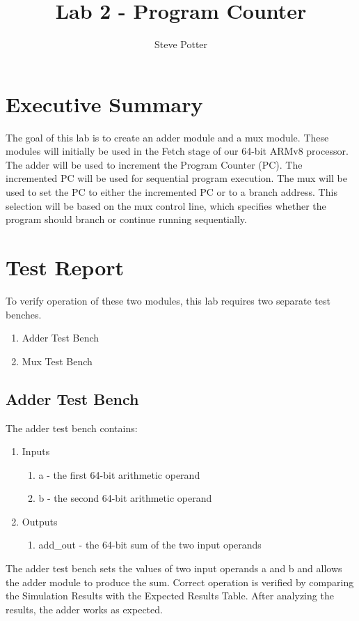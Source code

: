 \documentclass{article}
\author{Steve Potter}
\title{Lab 2 - Program Counter}
\begin{document}
\maketitle

\section{Executive Summary}
The goal of this lab is to create an adder module and a mux module.  These modules will initially be used in the Fetch stage of our 64-bit ARMv8 processor.  The adder will be used to increment the Program Counter (PC).  The incremented PC will be used for sequential program execution.  The mux will be used to set the PC to either the incremented PC or to a branch address.  This selection will be based on the mux control line, which specifies whether the program should branch or continue running sequentially.

\section{Test Report}
To verify operation of these two modules, this lab requires two separate test benches.
\begin{enumerate}
	\item Adder Test Bench
	\item Mux Test Bench
\end{enumerate}

\subsection{Adder Test Bench}
The adder test bench contains:
\begin{enumerate}
	\item Inputs
	\begin{enumerate}
		\item a - the first 64-bit arithmetic operand 
		\item b - the second 64-bit arithmetic operand
	\end{enumerate}	
	\item Outputs
	\begin{enumerate}	
		\item add\_out - the 64-bit sum of the two input operands
	\end{enumerate}
\end{enumerate} 

The adder test bench sets the values of two input operands a and b and allows the adder module to produce the sum.  Correct operation is verified by comparing the Simulation Results with the Expected Results Table.  After analyzing the results, the adder works as expected.
\end{document}
